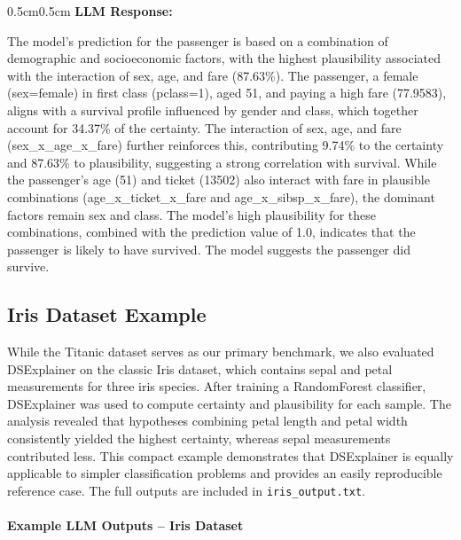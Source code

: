 \documentclass[acmlarge]{acmart}
\begin{document}
\begin{adjustwidth}{0.5cm}{0.5cm}
\vspace{0.5em}
\noindent\textbf{LLM Response:}

The model's prediction for the passenger is based on a combination of demographic and socioeconomic factors, with the highest plausibility associated with the interaction of sex, age, and fare (87.63\%). The passenger, a female (sex=female) in first class (pclass=1), aged 51, and paying a high fare (77.9583), aligns with a survival profile influenced by gender and class, which together account for 34.37\% of the certainty. The interaction of sex, age, and fare (sex\_x\_age\_x\_fare) further reinforces this, contributing 9.74\% to the certainty and 87.63\% to plausibility, suggesting a strong correlation with survival. While the passenger's age (51) and ticket (13502) also interact with fare in plausible combinations (age\_x\_ticket\_x\_fare and age\_x\_sibsp\_x\_fare), the dominant factors remain sex and class. The model's high plausibility for these combinations, combined with the prediction value of 1.0, indicates that the passenger is likely to have survived. The model suggests the passenger did survive.

\end{adjustwidth}


\subsection{Iris Dataset Example}

While the Titanic dataset serves as our primary benchmark, we also evaluated DSExplainer on the classic Iris dataset, which contains sepal and petal measurements for three iris species. After training a RandomForest classifier, DSExplainer was used to compute certainty and plausibility for each sample. The analysis revealed that hypotheses combining petal length and petal width consistently yielded the highest certainty, whereas sepal measurements contributed less. This compact example demonstrates that DSExplainer is equally applicable to simpler classification problems and provides an easily reproducible reference case. The full outputs are included in \texttt{iris\_output.txt}.
\paragraph{Example LLM Outputs – Iris Dataset}
\end{document}
